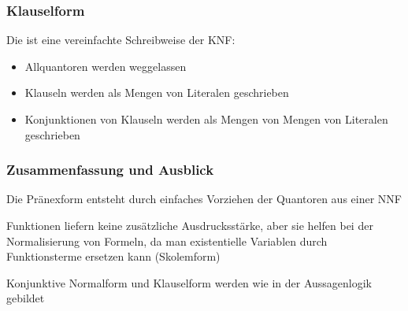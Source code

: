 \documentclass[onlymath]{beamer}
\begin{document}
\begin{frame}\frametitle{Klauselform}

Die  ist eine vereinfachte Schreibweise der KNF:
\begin{itemize}
\item Allquantoren werden weggelassen
\item Klauseln werden als Mengen von Literalen geschrieben
\item Konjunktionen von Klauseln werden als Mengen von Mengen von Literalen geschrieben
\end{itemize}


\end{frame}






\begin{frame}\frametitle{Zusammenfassung und Ausblick}

Die Pränexform entsteht durch einfaches Vorziehen der Quantoren aus einer NNF\bigskip

Funktionen liefern keine zusätzliche Ausdrucksstärke, aber sie helfen bei der
Normalisierung von Formeln, da man existentielle Variablen durch Funktionsterme ersetzen kann (Skolemform)
\bigskip

Konjunktive Normalform und Klauselform werden wie in der Aussagenlogik gebildet
\bigskip


\end{frame}
\end{document}
